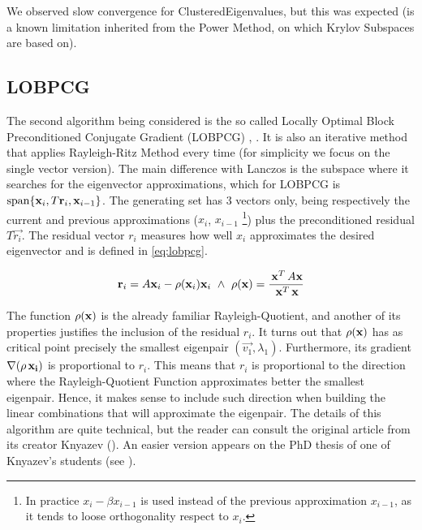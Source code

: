 We observed slow convergence for \gls{ClusteredEigenvalues}, but this
was expected (is a known limitation inherited from the Power
Method, on which Krylov Subspaces are based on).


\subsection{\gls{LOBPCG}}
\label{sub:lobpcg}

The second algorithm being considered is the so called Locally Optimal
Block Preconditioned Conjugate Gradient (\gls{LOBPCG})
\cite{knyazev01}, \cite{lashuk07}. It is also an
iterative method that applies Rayleigh-Ritz Method every time (for
simplicity we focus on the single vector version). The main difference
with Lanczos is the subspace where it searches for the eigenvector
approximations, which for \gls{LOBPCG} is $\operatorname{span} \{\mathbf{x}_i,
T\mathbf{r}_i, \mathbf{x}_{i-1}\}$. The generating set has 3 vectors only,
being respectively the current and previous approximations
($x_i$, $x_{i-1}$ \footnote{In practice $x_{i} - \beta x_{i-1}$ is used
  instead of the previous approximation $x_{i-1}$, as it tends to
  loose orthogonality respect to $x_i$.}) plus the preconditioned
residual $T\vec{r_i}$. The residual vector $r_i$ measures how well
$x_i$ approximates the desired eigenvector and is defined in
\cref{eq:lobpcg}. 

\begin{equation}
\label{eq:lobpcg}  
    \joinabove{0}
    \vec{r}_i = A\vec{x}_i - \func{\rho}(\vec{x}_i)\vec{x}_i
    \ds{\land}
    \func{\rho}(\vec{x}) = \dfrac{\trans{\vec{x}}A\vec{x}}{\trans{\vec{x}}\vec{x}}
\end{equation}
\joinbelow{1cm}

The function $\operatorname{\rho}(\mathbf{x})$ is the already familiar 
Rayleigh-Quotient, and another of its properties justifies the
inclusion of the residual $r_i$. It turns out that
$\operatorname{\rho}(\mathbf{x})$ has as critical point precisely the smallest
eigenpair $(\vec{v_1},\lambda_1)$. Furthermore, its gradient $\nabla
(\operatorname{\rho}\mathbf{x_i})$ is proportional to $r_i$. This means that
$r_i$ is proportional to the 
direction where the Rayleigh-Quotient Function approximates better
the smallest eigenpair. Hence, it makes sense to include such
direction when building the linear combinations that will approximate
the eigenpair. The details of this algorithm are quite
technical, but the reader can consult the original article from
its creator Knyazev (\cite{knyazev01}). An easier version
appears on the PhD thesis of one of Knyazev's students (see
\cite{lashuk07}).  \\ 

